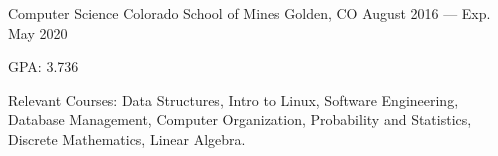 

\begin{cventries}

  \cventry
    {Computer Science} %
    {Colorado School of Mines} %
    {Golden, CO} %
    {August 2016 --- Exp. May 2020} %
    {
      \begin{cvitems} %
        \item {GPA\@: 3.736}
        \item {Relevant Courses: Data Structures, Intro to Linux, Software Engineering, Database Management, Computer Organization, Probability and Statistics, Discrete Mathematics, Linear Algebra.}
      \end{cvitems}
    }

\end{cventries}

